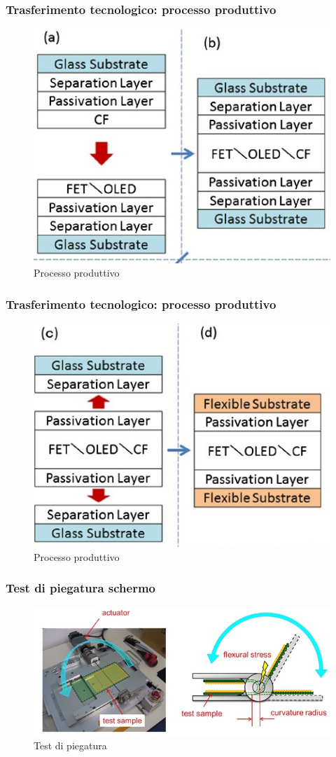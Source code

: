 \documentclass[12pt]{beamer}
\begin{document}
	\begin{frame}
		\frametitle{Trasferimento tecnologico: processo produttivo}
		\begin{figure}
			\centering
			\includegraphics[width=0.7\linewidth]{FISICA/tabella_formazione1}
			\caption{Processo produttivo}
			\label{fig:tabellaformazione1}
		\end{figure}
	\end{frame}
	\begin{frame}
		\frametitle{Trasferimento tecnologico: processo produttivo}
		\begin{figure}
			\centering
			\includegraphics[width=0.7\linewidth]{FISICA/tabella_formazione2}
			\caption{Processo produttivo}
			\label{fig:tabellaformazione2}
		\end{figure}
	\end{frame}
	\begin{frame}
		\frametitle{Test di piegatura schermo}
		\begin{figure}
			\centering
			\includegraphics[width=1\linewidth]{FISICA/test2}
			\caption{Test di piegatura}
			\label{fig:test2}
		\end{figure}
	\end{frame}
\end{document}
